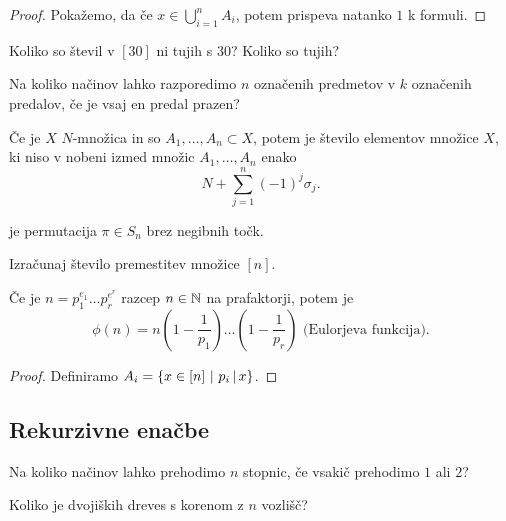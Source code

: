 \begin{proof}
    Pokažemo, da če $x \in \bigcup_{i=1}^n A_i$, potem prispeva natanko $1$ k formuli.
\end{proof}

\begin{primer}
    Koliko so števil v $[30]$ ni tujih s $30$? Koliko so tujih?
\end{primer}

\begin{primer}
    Na koliko načinov lahko razporedimo $n$ označenih predmetov v $k$ označenih predalov, če je vsaj en predal prazen?
\end{primer}

\begin{posledica}
    Če je $X$ $N$-množica in so $A_1, \ldots, A_n \subset X$, potem je število elementov množice $X$, ki niso v nobeni izmed množic $A_1, \ldots, A_n$ enako 
    $$N + \sum_{j=1}^{n}(-1)^j \sigma_j.$$
\end{posledica}

\begin{definicija}
     je permutacija $\pi \in S_n$ brez negibnih točk.
\end{definicija}

\begin{primer}
    Izračunaj število premestitev množice $[n]$.
\end{primer}

\begin{izrek}
    Če je $n = p_1^{e_1} \ldots p_r^{e^r}$ razcep $n \in \mathbb{N}$ na prafaktorji, potem je 
    $$\phi(n) = n(1 - \frac{1}{p_1}) \ldots (1 - \frac{1}{p_r}) \text{ (Eulorjeva funkcija)}.$$
\end{izrek}

\begin{proof}
    Definiramo \(A_i = \left\{x \in [n] \ | \ p_i \, | \, x\right\}\).
\end{proof}

\subsection{Rekurzivne enačbe}
\begin{primer} 
    Na koliko načinov lahko prehodimo $n$ stopnic, če vsakič prehodimo $1$ ali $2$?
\end{primer}

\begin{primer}
    Koliko je dvojiških dreves s korenom z $n$ vozlišč?
\end{primer}

